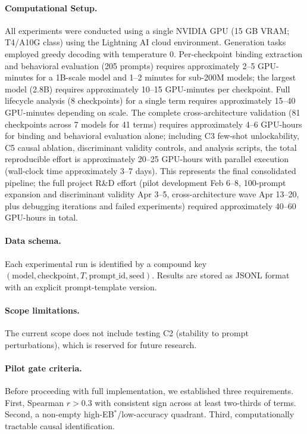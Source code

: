 \documentclass[10pt]{article} %
\begin{document}
\paragraph{Computational Setup.}
All experiments were conducted using a single NVIDIA GPU (15 GB VRAM; T4/A10G class) using the Lightning AI cloud environment. Generation tasks employed greedy decoding with temperature 0.
Per-checkpoint binding extraction and behavioral evaluation (205 prompts) requires approximately 2--5 GPU-minutes for a 1B-scale model and 1--2 minutes for sub-200M models; the largest model (2.8B) requires approximately 10--15 GPU-minutes per checkpoint. Full lifecycle analysis (8 checkpoints) for a single term requires approximately 15--40 GPU-minutes depending on scale. The complete cross-architecture validation (81 checkpoints across 7 models for 41 terms) requires approximately 4--6 GPU-hours for binding and behavioral evaluation alone; including C3 few-shot unlockability, C5 causal ablation, discriminant validity controls, and analysis scripts, the total reproducible effort is approximately 20--25 GPU-hours with parallel execution (wall-clock time approximately 3--7 days). This represents the final consolidated pipeline; the full project R&D effort (pilot development Feb 6--8, 100-prompt expansion and discriminant validity Apr 3--5, cross-architecture wave Apr 13--20, plus debugging iterations and failed experiments) required approximately 40--60 GPU-hours in total.

\paragraph{Data schema.}
Each experimental run is identified by a compound key $(\text{model},\text{checkpoint},T,\text{prompt\_id},\text{seed})$.
Results are stored as JSONL format with an explicit prompt-template version.

\paragraph{Scope limitations.}
The current scope does not include testing C2 (stability to prompt perturbations), which is reserved for future research.

\paragraph{Pilot gate criteria.}
Before proceeding with full implementation, we established three requirements. First, Spearman $r>0.3$ with consistent sign across at least two-thirds of terms. Second, a non-empty high-EB$^*$/low-accuracy quadrant. Third, computationally tractable causal identification.
\end{document}
